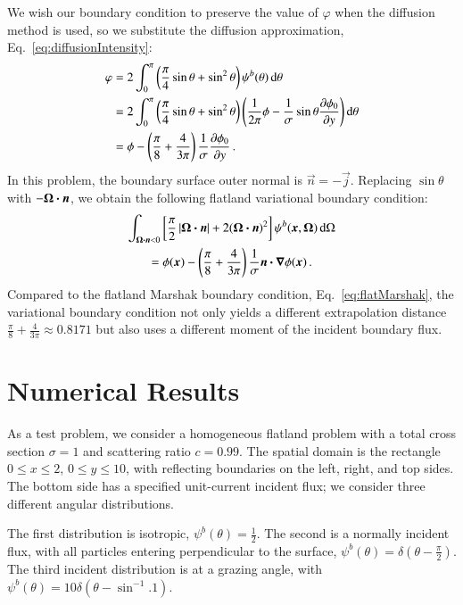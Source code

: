 \documentclass{anstrans}
\begin{document}
We wish our boundary condition to preserve the value of $\varphi$ when the
diffusion method is used, so we substitute the diffusion approximation,
Eq.~\eqref{eq:diffusionIntensity}:
\begin{align*}
 \varphi &= 2\int_{0}^{\pi} \left( \frac{\pi}{4} \sin\theta + \sin^2\theta \right)
 \psi^b(\theta) \mathop{}\!\mathrm{d}\theta
 \\
 &= 
  2\int_{0}^{\pi} \left( \frac{\pi}{4} \sin\theta + \sin^2\theta \right)
 \left( \frac{1}{2\pi} \phi -
  \frac{1}{\sigma} \sin\theta \frac{\partial \phi_0}{\partial y}\right)\mathop{}\!\mathrm{d}\theta
\\
 &= 
  \phi
- \left( \frac{\pi}{8} + \frac{4}{3\pi} \right) \frac{1}{\sigma} \frac{\partial \phi_0}{\partial y}
\,.
\end{align*}
In this problem, the boundary surface outer normal is $\vec{n}=-\vec{j}$. 
Replacing $\sin \theta$ with $-\bm{\Omega}\bm{\cdot}\bm{n}$, we obtain the following
flatland variational boundary condition:
\begin{multline} \label{eq:flatVarBc}
\int_{\bm{\Omega}\bm{\cdot}\bm{n} < 0} \left[ \frac{\pi}{2}
\left| \bm{\Omega}\bm{\cdot}\bm{n} \right| + 2 (\bm{\Omega}\bm{\cdot}\bm{n})^2 \right]
\psi^b(\bm{x}, \bm{\Omega}) \mathop{}\!\mathrm{d}\Omega
\\
= 
  \phi(\bm{x})
  - \left( \frac{\pi}{8} + \frac{4}{3\pi} \right) \frac{1}{\sigma}
  \bm{n}\bm{\cdot}\bm{\nabla} \phi(\bm{x})\,.
\end{multline}
Compared to the flatland Marshak boundary condition,
Eq.~\eqref{eq:flatMarshak}, the variational boundary condition not only yields a
different extrapolation distance $\frac{\pi}{8} + \frac{4}{3\pi} \approx
0.8171$ but also uses a different moment of the incident boundary flux.

\section{Numerical Results}
As a test problem, we consider a homogeneous flatland problem with a
total cross section $\sigma=1$ and scattering ratio $c=0.99$. The spatial 
domain is the rectangle $0 \le x \le 2$, \linebreak $0 \le y \le 10$, with
reflecting boundaries on the left,
right, and top sides. The bottom side has a specified unit-current incident
flux; we consider three different angular
distributions.


The first distribution is isotropic, $\psi^b(\theta) = \frac{1}{2}$. The second
is a normally incident flux, with all particles entering
perpendicular to the surface, $\psi^b(\theta) = \delta(\theta -
\frac{\pi}{2})$. The third incident distribution is at a grazing angle, with 
$\psi^b(\theta) = 10 \delta(\theta - \sin^{-1}.1)$.
\end{document}
